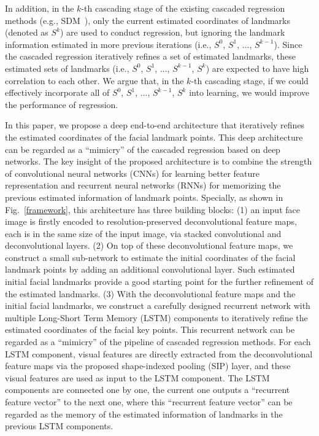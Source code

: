 \documentclass[journal]{IEEEtran}
\begin{document}
In addition, in the $k$-th cascading stage of the existing cascaded regression methods (e.g., SDM~\cite{sdm}), only the current estimated coordinates of landmarks (denoted as $S^k$) are used to conduct regression, but ignoring the landmark information estimated in more previous iterations (i.e., $S^0$, $S^1$, ..., $S^{k-1}$). Since the cascaded regression iteratively refines a set of estimated landmarks, these estimated sets of landmarks (i.e., $S^0$, $S^1$, ..., $S^{k-1}$, $S^{k}$) are expected to have high correlation to each other. We argue that, in the $k$-th cascading stage, if we could effectively incorporate all of $S^0$, $S^1$, ..., $S^{k-1}$, $S^{k}$ into learning, we would improve the performance of regression.

In this paper, we propose a deep end-to-end architecture that iteratively refines the estimated coordinates of the facial landmark points. This deep architecture can be regarded as a ``mimicry'' of the cascaded regression based on deep networks. The key insight of the proposed architecture is to combine the strength of convolutional neural networks (CNNs) for learning better feature representation and recurrent neural networks (RNNs) for memorizing the previous estimated information of landmark points. Specially, as shown in Fig.~\ref{framework},  this architecture has three building blocks: (1) an input face image is firstly encoded to resolution-preserved deconvolutional feature maps, each is in the same size of the input image, via stacked convolutional and deconvolutional layers. (2) On top of these deconvolutional feature maps, we construct a small sub-network to estimate the initial coordinates of the facial landmark points by adding an additional convolutional layer. Such estimated initial facial landmarks provide a good starting point for the further refinement of the estimated landmarks. (3) With the deconvolutional feature maps and the initial facial landmarks, we construct a carefully designed recurrent network with multiple Long-Short Term Memory (LSTM) components to iteratively refine the estimated coordinates of the facial key points. This recurrent network can be regarded as a ``mimicry'' of the pipeline of cascaded regression methods. For each LSTM component, visual features are directly extracted from the deconvolutional feature maps via the proposed shape-indexed pooling (SIP) layer, and these visual features are used as input to the LSTM component. The LSTM components are connected one by one, the current one outputs a ``recurrent feature vector'' to the next one, where this ``recurrent feature vector'' can be regarded as the memory of the estimated information of landmarks in the previous LSTM components.
\end{document}
